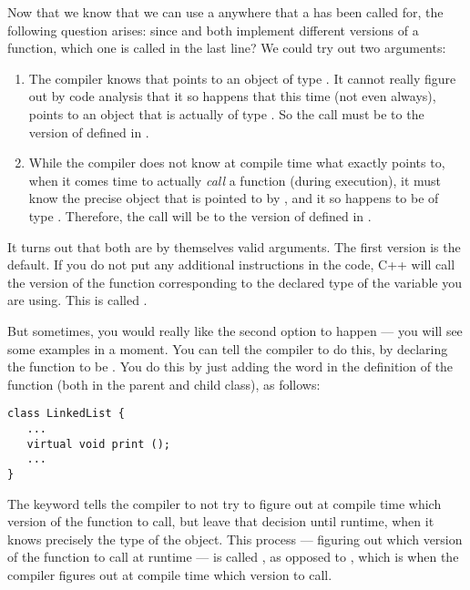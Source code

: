 Now that we know that we can use a  anywhere
that a  has been called for,
the following question arises:
since  and   both
implement different versions of a  function,
which one is called in the last line?
We could try out two arguments:
\begin{enumerate}
\item The compiler knows that  points to an object of type
  . It cannot really figure out by code
  analysis that it so happens that this time (not even always),
   points to an object that is actually of type
  . 
  So the call must be to the version of  defined in .
\item While the compiler does not know at compile time what exactly
   points to, when it comes time to actually \emph{call} a
  function (during execution), it must know the precise object that is
  pointed to by ,
  and it so happens to be of type . 
  Therefore, the call will be to the version of  defined in
  .
\end{enumerate}

It turns out that both are by themselves valid arguments.
The first version is the default.
If you do not put any additional instructions in the code,
C++ will call the version of the function corresponding
to the declared type of the variable you are using.
This is called .

But sometimes, you would really like the second option to happen
--- you will see some examples in a moment.
You can tell the compiler to do this,
by declaring the  function to be .
You do this by just adding the word  in the definition of
the function (both in the parent and child class), as follows:
\begin{verbatim}
class LinkedList {
   ...
   virtual void print ();
   ...
}
\end{verbatim}

The keyword  tells the compiler to not try to figure out
at compile time which version of the function to call,
but leave that decision until runtime,
when it knows precisely the type of the object.
This process --- figuring out which version of the function to
call at runtime --- is called ,
as opposed to ,
which is when the compiler figures out at
compile time which version to call.

